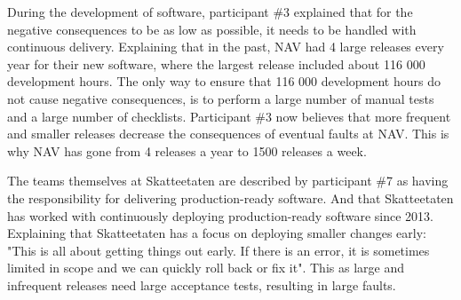 
During the development of software, participant \#3 explained that for the negative consequences to be as low as possible, it needs to be handled with continuous delivery. Explaining that in the past, NAV had 4 large releases every year for their new software, where the largest release included about 116 000 development hours. The only way to ensure that 116 000 development hours do not cause negative consequences, is to perform a large number of manual tests and a large number of checklists. Participant \#3 now believes that more frequent and smaller releases decrease the consequences of eventual faults at NAV. This is why NAV has gone from 4 releases a year to 1500 releases a week.


The teams themselves at Skatteetaten are described by participant \#7 as having the responsibility for delivering production-ready software. And that Skatteetaten has worked with continuously deploying production-ready software since 2013. Explaining that Skatteetaten has a focus on deploying smaller changes early: "This is all about getting things out early. If there is an error, it is sometimes limited in scope and we can quickly roll back or fix it". This as large and infrequent releases need large acceptance tests, resulting in large faults.

